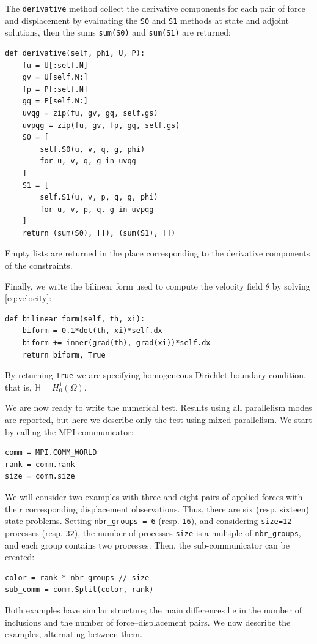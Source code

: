 \documentclass[iicol,pdflatex,sn-mathphys-ay]{sn-jnl}%
\theoremstyle{thmstyleone}%
\theoremstyle{thmstyletwo}%
\theoremstyle{thmstylethree}%
\begin{document}
The \texttt{derivative} method collect the derivative components
for each pair of force and displacement
by evaluating the \texttt{S0} and \texttt{S1} methods
at state and adjoint solutions,
then the sums \texttt{sum(S0)} and \texttt{sum(S1)} are returned: 
\begin{lstlisting}
def derivative(self, phi, U, P):
	fu = U[:self.N]
	gv = U[self.N:]
	fp = P[:self.N]
	gq = P[self.N:]
	uvqg = zip(fu, gv, gq, self.gs)
	uvpqg = zip(fu, gv, fp, gq, self.gs)
	S0 = [
		self.S0(u, v, q, g, phi)
		for u, v, q, g in uvqg
	]
	S1 = [
		self.S1(u, v, p, q, g, phi)
		for u, v, p, q, g in uvpqg
	]
	return (sum(S0), []), (sum(S1), [])
\end{lstlisting}
Empty lists are returned in the place corresponding
to the derivative components of the constraints.

Finally, we write the bilinear form used to compute
the velocity field $\theta$ by solving \eqref{eq:velocity}:
\begin{lstlisting}
def bilinear_form(self, th, xi):
    biform = 0.1*dot(th, xi)*self.dx
	biform += inner(grad(th), grad(xi))*self.dx    
	return biform, True
\end{lstlisting}
By returning \texttt{True} we are specifying homogeneous Dirichlet boundary condition,
that is, $\mathbb{H}=H^1_0(\Omega)$.

We are now ready to write the numerical test. 
Results using all parallelism modes are reported,
but here we describe only the test using mixed parallelism.
We start by calling the MPI communicator:
\begin{lstlisting}
comm = MPI.COMM_WORLD
rank = comm.rank
size = comm.size
\end{lstlisting}

We will consider two examples with three and eight pairs of
applied forces with their corresponding displacement observations.
Thus, there are six (resp. sixteen) state problems.
Setting \texttt{nbr\_groups = 6} (resp. \texttt{16}),
and considering \texttt{size=12} processes (resp. \texttt{32}),
the number of processes \texttt{size} is a multiple of \texttt{nbr\_groups},
and each group contains two processes.
Then, the sub-communicator can be created:
\begin{lstlisting}
color = rank * nbr_groups // size
sub_comm = comm.Split(color, rank)
\end{lstlisting}

Both examples have similar structure; the main differences lie in
the number of inclusions and the number of force--displacement pairs. 
We now describe the examples, alternating between them.
\end{document}
